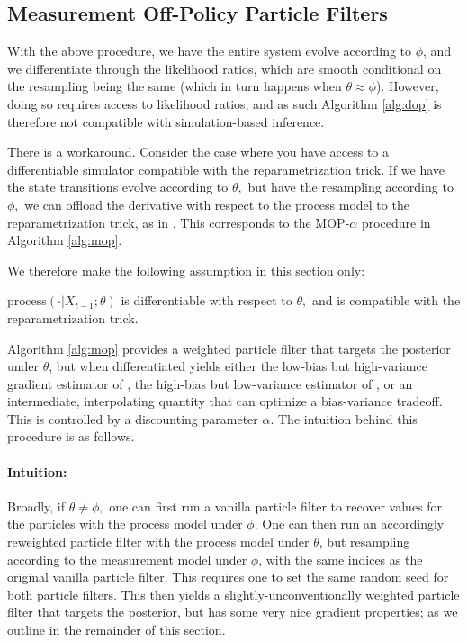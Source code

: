 \documentclass{article}
\begin{document}
\subsection{Measurement Off-Policy Particle Filters}

With the above procedure, we have the entire system evolve according to $\phi$, and we differentiate through the likelihood ratios, which are smooth conditional on the resampling being the same (which in turn happens when $\theta \approx \phi$). However, doing so requires access to likelihood ratios, and as such Algorithm \ref{alg:dop} is therefore not compatible with simulation-based inference. 

There is a workaround. Consider the case where you have access to a differentiable simulator compatible with the reparametrization trick. If we have the state transitions evolve according to $\theta,$ but have the resampling according to $\phi,$ we can offload the derivative with respect to the process model to the reparametrization trick, as in \cite{corenflos2021ot}. This corresponds to the MOP-$\alpha$ procedure in Algorithm \ref{alg:mop}. 

We therefore make the following assumption in this section only:
\begin{aspt}
    $\text{process}(\cdot | X_{t-1}; \theta)$ is differentiable with respect to $\theta,$ and is compatible with the reparametrization trick. 
\end{aspt}

Algorithm \ref{alg:mop} provides a weighted particle filter that targets the posterior under $\theta$, but when differentiated yields either the low-bias but high-variance gradient estimator of \cite{poyiadjis11}, the high-bias but low-variance estimator of \cite{blei2018vsmc}, or an intermediate, interpolating quantity that can optimize a bias-variance tradeoff. This is controlled by a discounting parameter $\alpha$. The intuition behind this procedure is as follows. 

\paragraph{Intuition:} Broadly, if $\theta\neq\phi,$ one can first run a vanilla particle filter to recover values for the particles with the process model under $\phi.$ One can then run an accordingly reweighted particle filter with the process model under $\theta$, but resampling according to the measurement model under $\phi$, with the same indices as the original vanilla particle filter. This requires one to set the same random seed for both particle filters. This then yields a slightly-unconventionally weighted particle filter that targets the posterior, but has some very nice gradient properties; as we outline in the remainder of this section.
\end{document}
